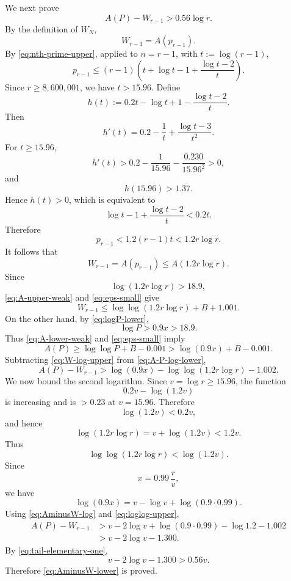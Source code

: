 \documentclass[11pt]{article}
\numberwithin{equation}{section}
\theoremstyle{plain}
\theoremstyle{definition}
\theoremstyle{remark}
\begin{document}
We next prove
\begin{equation}\label{eq:AminusW-lower}
A(P)-W_{r-1}>0.56\log r.
\end{equation}
By the definition of \(W_N\),
\[
        W_{r-1}=A(p_{r-1}).
\]
By \eqref{eq:nth-prime-upper}, applied to \(n=r-1\), with \(t:=\log(r-1)\),
\[
        p_{r-1}
        \le
        (r-1)\left(
        t+\log t-1+\frac{\log t-2}{t}
        \right).
\]
Since \(r\ge8{,}600{,}001\), we have \(t>15.96\).  Define
\[
        h(t):=0.2t-\log t+1-\frac{\log t-2}{t}.
\]
Then
\[
        h'(t)=0.2-\frac1t+\frac{\log t-3}{t^2}.
\]
For \(t\ge15.96\),
\[
        h'(t)>0.2-\frac1{15.96}-\frac{0.230}{15.96^2}>0,
\]
and
\[
        h(15.96)>1.37.
\]
Hence \(h(t)>0\), which is equivalent to
\[
        \log t-1+\frac{\log t-2}{t}<0.2t.
\]
Therefore
\[
        p_{r-1}<1.2(r-1)t<1.2r\log r.
\]
It follows that
\begin{equation}\label{eq:W-upper-by-A}
W_{r-1}=A(p_{r-1})
        \le
        A(1.2r\log r).
\end{equation}
Since
\[
        \log(1.2r\log r)>18.9,
\]
\eqref{eq:A-upper-weak} and \eqref{eq:eps-small} give
\begin{equation}\label{eq:W-log-upper}
W_{r-1}
        \le
        \log\log(1.2r\log r)+B+1.001.
\end{equation}
On the other hand, by \eqref{eq:logP-lower},
\[
        \log P>0.9x>18.9.
\]
Thus \eqref{eq:A-lower-weak} and \eqref{eq:eps-small} imply
\begin{equation}\label{eq:A-P-log-lower}
A(P)
        \ge
        \log\log P+B-0.001
        >
        \log(0.9x)+B-0.001.
\end{equation}
Subtracting \eqref{eq:W-log-upper} from \eqref{eq:A-P-log-lower},
\begin{equation}\label{eq:AminusW-log}
A(P)-W_{r-1}
        >
        \log(0.9x)-\log\log(1.2r\log r)-1.002.
\end{equation}
We now bound the second logarithm.  Since \(v=\log r\ge15.96\), the function
\[
        0.2v-\log(1.2v)
\]
is increasing and is \(>0.23\) at \(v=15.96\).  Therefore
\[
        \log(1.2v)<0.2v,
\]
and hence
\[
        \log(1.2r\log r)
        =
        v+\log(1.2v)
        <
        1.2v.
\]
Thus
\begin{equation}\label{eq:loglog-upper}
\log\log(1.2r\log r)<\log(1.2v).
\end{equation}
Since
\[
        x=0.99\,\frac r v,
\]
we have
\[
        \log(0.9x)=v-\log v+\log(0.9\cdot0.99).
\]
Using \eqref{eq:AminusW-log} and \eqref{eq:loglog-upper},
\[
\begin{aligned}
        A(P)-W_{r-1}
        &>
        v-2\log v+\log(0.9\cdot0.99)-\log1.2-1.002\\
        &>
        v-2\log v-1.300.
\end{aligned}
\]
By \eqref{eq:tail-elementary-one},
\[
        v-2\log v-1.300>0.56v.
\]
Therefore \eqref{eq:AminusW-lower} is proved.
\end{document}
